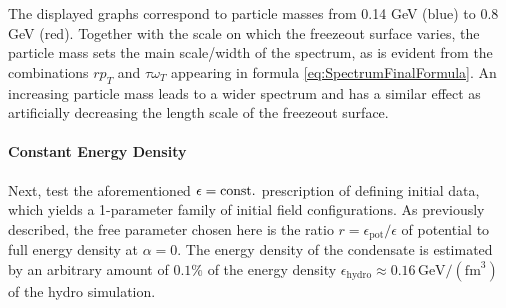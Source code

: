 The displayed graphs correspond to particle masses from 0.14 GeV (blue) to 0.8 GeV (red). Together with the scale on which the freezeout surface varies, the particle mass sets the main scale/width of the spectrum, as is evident from the combinations ${rp_T}$ and ${\tau\omega_T}$ appearing in formula \eqref{eq:SpectrumFinalFormula}. An increasing particle mass leads to a wider spectrum and has a similar effect as artificially decreasing the length scale of the freezeout surface.

\paragraph{Constant Energy Density}

Next, test the aforementioned $\epsilon={\text{const.}}$ prescription of defining initial data, which yields a 1-parameter family of initial field configurations. As previously described, the free parameter chosen here is the ratio ${r=\epsilon_{\text{pot}}/\epsilon}$ of potential to full energy density at ${\alpha=0}$. The energy density of the condensate is estimated by an arbitrary amount of $0.1\%$ of the energy density ${\epsilon_{\text{hydro}}\approx 0.16\,\mathrm{GeV}/(\mathrm{fm}^3)}$ of the hydro simulation.\\
